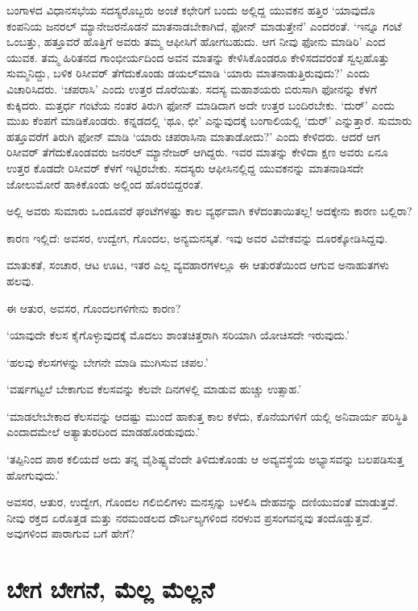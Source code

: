 ಬಂಗಾಳದ ವಿಧಾನಸಭೆಯ ಸದಸ್ಯರೊಬ್ಬರು ಅಂಚೆ ಕಛೇರಿಗೆ ಬಂದು ಅಲ್ಲಿದ್ದ ಯುವಕನ ಹತ್ತಿರ ‘ಯಾವುದೊ ಕಂಪನಿಯ ಜನರಲ್ ಮ್ಯಾನೇಜರನೊಡನೆ ಮಾತನಾಡಬೇಕಾಗಿದೆ, ಫೋನ್ ಮಾಡುತ್ತೇನೆ’ ಎಂದರಂತೆ. ‘ಇನ್ನೂ ಗಂಟೆ ಒಂಬತ್ತು, ಹತ್ತೂವರೆ ಹೊತ್ತಿಗೆ ಅವರು ತಮ್ಮ ಆಫೀಸಿಗೆ ಹೋಗಬಹುದು. ಆಗ ನೀವು ಫೋನು ಮಾಡಿರಿ’ ಎಂದ ಯುವಕ. ತಮ್ಮ ಹಿರಿತನದ ಗಾಂಭೀರ್ಯದಿಂದ ಅವನ ಮಾತನ್ನು ಕೇಳಿಸಿಕೊಂಡರೂ ಕೇಳಿಸದವರಂತೆ ಸ್ವಲ್ಪಹೊತ್ತು ಸುಮ್ಮನಿದ್ದು, ಬಳಿಕ ರಿಸೀವರ್ ತೆಗೆದುಕೊಂಡು ಡಯಲ್​ಮಾಡಿ ‘ಯಾರು ಮಾತನಾಡುತ್ತಿರುವುದು?’ ಎಂದು ವಿಚಾರಿಸಿದರು. ‘ಚಪರಾಸಿ’ ಎಂದು ಉತ್ತರ ದೊರೆಯಿತು. ಸದಸ್ಯ ಮಹಾಶಯರು ಬಿರುಸಾಗಿ ಫೋನನ್ನು ಕೆಳಗೆ ಕುಕ್ಕಿದರು. ಮತ್ತರ್ಧ ಗಂಟೆಯ ನಂತರ ತಿರುಗಿ ಫೋನ್ ಮಾಡಿದಾಗ ಅದೇ ಉತ್ತರ ಬಂದಿರಬೇಕು. ‘ದುರ್​’ ಎಂದು ಮುಖ ಕೆಂಪಗೆ ಮಾಡಿಕೊಂಡರು. ಕನ್ನಡದಲ್ಲಿ ‘ಥೂ, ಛೀ’ ಎನ್ನುವುದಕ್ಕೆ ಬಂಗಾಲಿಯಲ್ಲಿ ‘ದುರ್​’ ಎನ್ನುತ್ತಾರೆ. ಸುಮಾರು ಹತ್ತೂವರೆಗೆ ತಿರುಗಿ ಫೋನ್ ಮಾಡಿ ‘ಯಾರು ಚಪರಾಸಿನಾ ಮಾತಾಡೋದು?’ ಎಂದು ಕೇಳಿದರು. ಆದರೆ ಆಗ ರಿಸೀವರ್ ತೆಗೆದುಕೊಂಡವರು ಜನರಲ್ ಮ್ಯಾನೇಜರ್ ಆಗಿದ್ದರು. ಇವರ ಮಾತನ್ನು ಕೇಳಿದಾ ಕ್ಷಣ ಅವರು ಏನೂ ಉತ್ತರ ಕೊಡದೇ ರಿಸೀವರ್ ಕೆಳಗೆ ಇಟ್ಟಿರಬೇಕು. ಸದಸ್ಯರು ಆಫೀಸಿನಲ್ಲಿದ್ದ ಯುವಕನನ್ನು ಮಾತನಾಡಿಸದೇ ಜೋಲುಮೋರೆ ಹಾಕಿಕೊಂಡು ಅಲ್ಲಿಂದ ಹೊರಬಿದ್ದರಂತೆ.

ಅಲ್ಲಿ ಅವರು ಸುಮಾರು ಒಂದೂವರೆ ಘಂಟೆಗಳಷ್ಟು ಕಾಲ ವ್ಯರ್ಥವಾಗಿ ಕಳೆದಂತಾಯಿತಲ್ಲ! ಅದಕ್ಕೇನು ಕಾರಣ ಬಲ್ಲಿರಾ?

ಕಾರಣ ಇಲ್ಲಿದೆ: ಅವಸರ, ಉದ್ವೇಗ, ಗೊಂದಲ, ಅನ್ಯಮನಸ್ಕತೆ. ಇವು ಅವರ ವಿವೇಕವನ್ನು ದೂರಕ್ಕೋಡಿಸಿದ್ದವು.

ಮಾತುಕತೆ, ಸಂಚಾರ, ಆಟ ಊಟ, ಇತರ ಎಲ್ಲ ವ್ಯವಹಾರಗಳಲ್ಲೂ ಈ ಆತುರತೆಯಿಂದ ಆಗುವ ಅನಾಹುತಗಳು ಹಲವು.

ಈ ಆತುರ, ಅವಸರ, ಗೊಂದಲಗಳಿಗೇನು ಕಾರಣ?

‘ಯಾವುದೇ ಕೆಲಸ ಕೈಗೊಳ್ಳುವುದಕ್ಕೆ ಮೊದಲು ಶಾಂತಚಿತ್ತರಾಗಿ ಸರಿಯಾಗಿ ಯೋಚಿಸದೇ ಇರುವುದು.’

‘ಹಲವು ಕೆಲಸಗಳನ್ನು ಬೇಗನೇ ಮಾಡಿ ಮುಗಿಸುವ ಚಪಲ.’

‘ವರ್ಷಗಟ್ಟಲೆ ಬೇಕಾಗುವ ಕೆಲಸವನ್ನು ಕೆಲವೇ ದಿನಗಳಲ್ಲಿ ಮಾಡುವ ಹುಚ್ಚು ಉತ್ಸಾಹ.’

‘ಮಾಡಲೇಬೇಕಾದ ಕೆಲಸವನ್ನು ಆದಷ್ಟು ಮುಂದೆ ಹಾಕುತ್ತ ಕಾಲ ಕಳೆದು, ಕೊನೆಯಗಳಿಗೆ ಯಲ್ಲಿ ಅನಿವಾರ್ಯ ಪರಿಸ್ಥಿತಿ ಎಂದಾದಮೇಲೆ ಅತ್ಯಾತುರದಿಂದ ಮಾಡಹೊರಡುವುದು.’

‘ತಪ್ಪಿನಿಂದ ಪಾಠ ಕಲಿಯದೆ ಅದು ತನ್ನ ವೈಶಿಷ್ಟ್ಯವೆಂದೇ ತಿಳಿದುಕೊಂಡು ಆ ಅವ್ಯವಸ್ಥೆಯ ಅಭ್ಯಾಸವನ್ನು ಬಲಪಡಿಸುತ್ತ ಹೋಗುವುದು.’

ಅವಸರ, ಆತುರ, ಉದ್ವೇಗ, ಗೊಂದಲ ಗಲಿಬಿಲಿಗಳು ಮನಸ್ಸನ್ನು ಬಳಲಿಸಿ ದೇಹವನ್ನು ದಣಿಯುವಂತೆ ಮಾಡುತ್ತವೆ. ನೀವು ರಕ್ತದ ಏರೊತ್ತಡ ಮತ್ತು ನರಮಂಡಲದ ದೌರ್ಬಲ್ಯಗಳಿಂದ ನರಳುವ ಪ್ರಸಂಗವನ್ನವು ತಂದೊಡ್ಡುತ್ತವೆ. ಅವುಗಳಿಂದ ಪಾರಾಗುವ ಬಗೆ ಹೇಗೆ?


\section*{ಬೇಗ ಬೇಗನೆ, ಮೆಲ್ಲ ಮೆಲ್ಲನೆ}


